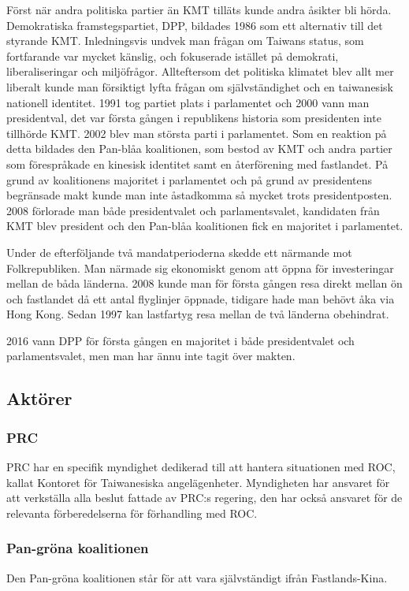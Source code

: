 \documentclass[a4paper,10pt]{article}
\begin{document}
Först när andra politiska partier än KMT tilläts kunde andra åsikter bli hörda. Demokratiska framstegspartiet, DPP, bildades 1986 som ett alternativ till det styrande KMT. Inledningsvis undvek man frågan om Taiwans status, som fortfarande var mycket känslig, och fokuserade istället på demokrati, liberaliseringar och miljöfrågor. Allteftersom det politiska klimatet blev allt mer liberalt kunde man försiktigt lyfta frågan om självständighet och en taiwanesisk nationell identitet. 1991 tog partiet plats i parlamentet och 2000 vann man presidentval, det var första gången i republikens historia som presidenten inte tillhörde KMT. 2002 blev man största parti i parlamentet. Som en reaktion på detta bildades den Pan-blåa koalitionen, som bestod av KMT och andra partier som förespråkade en kinesisk identitet samt en återförening med fastlandet. På grund av koalitionens majoritet i parlamentet och på grund av presidentens begränsade makt kunde man inte åstadkomma så mycket trots presidentposten. 2008 förlorade man både presidentvalet och parlamentsvalet, kandidaten från KMT blev president och den Pan-blåa koalitionen fick en majoritet i parlamentet.

Under de efterföljande två mandatperioderna skedde ett närmande mot Folkrepubliken. Man närmade sig ekonomiskt genom att öppna för investeringar mellan de båda länderna. 2008 kunde man för första gången resa direkt mellan ön och fastlandet då ett antal flyglinjer öppnade, tidigare hade man behövt åka via Hong Kong. Sedan 1997 kan lastfartyg resa mellan de två länderna obehindrat.

2016 vann DPP för första gången en majoritet i både presidentvalet och parlamentsvalet, men man har ännu inte tagit över makten.


\subsection*{Aktörer}

\subsubsection*{PRC}
PRC har en specifik myndighet dedikerad till att hantera situationen med ROC, kallat Kontoret för Taiwanesiska angelägenheter. Myndigheten har ansvaret för att verkställa alla beslut fattade av PRC:s regering, den har också ansvaret för de relevanta förberedelserna för förhandling med ROC.

\subsubsection*{Pan-gröna koalitionen}
Den Pan-gröna koalitionen står för att vara självständigt ifrån Fastlands-Kina.
\end{document}
